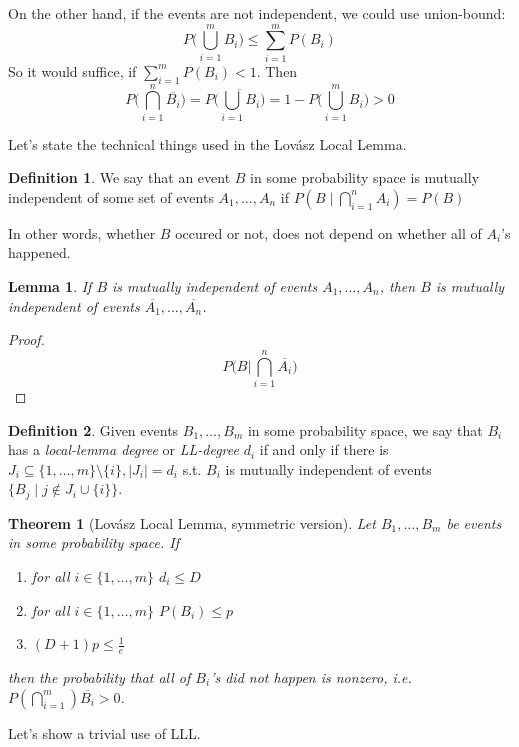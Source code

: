 \documentclass{article}
\theoremstyle{plain}
\newtheorem{thm}{Theorem}
\newtheorem{lem}{Lemma}[thm]
\theoremstyle{definition}
\newtheorem{defn}{Definition}
\begin{document}
On the other hand, if the events are not independent, we could use union-bound:
$$
P\bigg(\bigcup_{i=1}^mB_i\bigg) \leq \sum_{i=1}^mP(B_i)
$$
So it would suffice, if $\sum_{i=1}^mP(B_i)<1$. Then 
$$
P\bigg(\bigcap_{i=1}^n \overline{B_i}\bigg) = P\bigg(\overline{\bigcup_{i=1}B_i}\bigg)=1-P\bigg(\bigcup_{i=1}^mB_i\bigg)>0
$$



Let's state the technical things used in the Lovász Local Lemma.

\begin{defn}
	We say that an event $B$ in some probability space is mutually independent of some set of events $A_1,\ldots, A_n$ if $P(B\mid \bigcap_{i=1}^nA_i)=P(B)$
\end{defn}
In other words, whether $B$ occured or not, does not depend on whether all of $A_i$'s happened.


\begin{lem}
If $B$ is mutually independent of events $A_1,\ldots, A_n$, then $B$ is mutually independent of events $\overline{A_1},\ldots, \overline{A_n}$.
\end{lem}
\begin{proof}
	$$
	P\bigg(B\bigg| \bigcap_{i=1}^n \overline{A_i}\bigg)
	$$
\end{proof}

\begin{defn}
	Given events $B_1,\ldots, B_m$ in some probability space, we say that $B_i$ has a \textit{local-lemma degree} or \textit{LL-degree} $d_i$ if and only if there is $J_i\subseteq \{1,\ldots, m\}\setminus \{i\},|J_i|=d_i$ s.t. $B_i$ is mutually independent of events $\{B_j \mid j \notin J_i\cup \{i\}\}$.
\end{defn}

\begin{thm}[Lovász Local Lemma, symmetric version]
	Let $B_1,\ldots, B_m$ be events in some probability space. If
	\begin{enumerate}
		\item for all $i\in\{1,\ldots,m\}$ $d_i\leq D$
		\item for all $i\in\{1,\ldots, m\}$ $P(B_i)\leq p$
		\item $(D+1)p\leq \frac{1}{e}$
	\end{enumerate}
	then the probability that all of $B_i$'s did not happen is nonzero, i.e. $P(\bigcap_{i=1}^m)\overline{B_i}>0$.
\end{thm}

Let's show a trivial use of LLL.
\end{document}
